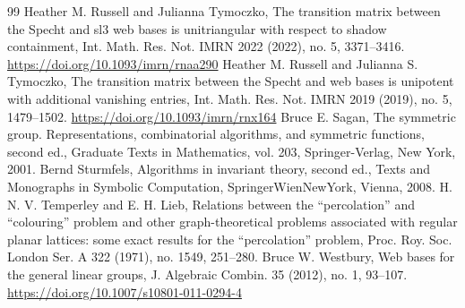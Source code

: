 \begin{thebibliography}{99}
 Heather M. Russell and Julianna Tymoczko, The transition matrix between the Specht and sl3 web bases is unitriangular with respect to shadow containment, Int. Math. Res. Not. IMRN 2022 (2022), no. 5, 3371–3416. \url{https://doi.org/10.1093/imrn/rnaa290}
 Heather M. Russell and Julianna S. Tymoczko, The transition matrix between the Specht and web bases is unipotent with additional vanishing entries, Int. Math. Res. Not. IMRN 2019 (2019), no. 5, 1479–1502. \url{https://doi.org/10.1093/imrn/rnx164}
 Bruce E. Sagan, The symmetric group. Representations, combinatorial algorithms, and symmetric functions, second ed., Graduate Texts in Mathematics, vol. 203, Springer-Verlag, New York, 2001. 
 Bernd Sturmfels, Algorithms in invariant theory, second ed., Texts and Monographs in Symbolic Computation, SpringerWienNewYork, Vienna, 2008. 
 H. N. V. Temperley and E. H. Lieb, Relations between the “percolation” and “colouring” problem and other graph-theoretical problems associated with regular planar lattices: some exact results for the “percolation” problem, Proc. Roy. Soc. London Ser. A 322 (1971), no. 1549, 251–280. 
 Bruce W. Westbury, Web bases for the general linear groups, J. Algebraic Combin. 35 (2012), no. 1, 93–107. \url{https://doi.org/10.1007/s10801-011-0294-4}
\end{thebibliography}
